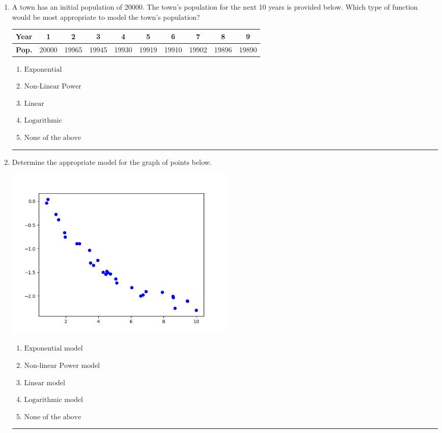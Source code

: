\documentclass[14pt]{extbook}
\newcommand{\litem}[1]{\item#1\hspace*{-1cm}\rule{\textwidth}{0.4pt}}
\begin{document}
\begin{enumerate}
\litem{
A town has an initial population of 20000. The town's population for the next 10 years is provided below. Which type of function would be most appropriate to model the town's population?


\begin{tabular}{c|c|c|c|c|c|c|c|c|c}
\textbf{Year} & 1 & 2 & 3 & 4 & 5 & 6 & 7 & 8 & 9 \tabularnewline
\hline
\textbf{Pop.} & 20000 & 19965 & 19945 & 19930 & 19919 & 19910 & 19902 & 19896 & 19890
\end{tabular} \begin{enumerate}[label=\Alph*.]
\item \( \text{Exponential} \)
\item \( \text{Non-Linear Power} \)
\item \( \text{Linear} \)
\item \( \text{Logarithmic} \)
\item \( \text{None of the above} \)

\end{enumerate} }
\litem{
Determine the appropriate model for the graph of points below.
\begin{center}
    \includegraphics[width=0.5\textwidth]{../Figures/identifyModelGraph11CopyA.png}
\end{center}
\begin{enumerate}[label=\Alph*.]
\item \( \text{Exponential model} \)
\item \( \text{Non-linear Power model} \)
\item \( \text{Linear model} \)
\item \( \text{Logarithmic model} \)
\item \( \text{None of the above} \)


\end{enumerate}}
\end{enumerate}
\end{document}
